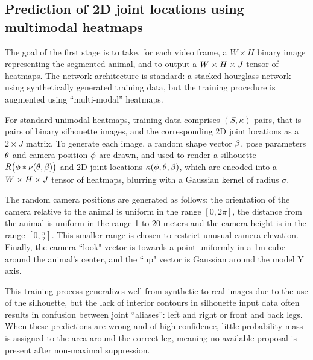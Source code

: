   \subsection{Prediction of 2D joint locations using multimodal heatmaps}
  The goal of the first stage is to take, for each video frame, a $W\times H$ binary image representing the segmented animal, and to output a $W \times H \times J$ tensor of heatmaps. The network architecture is standard: a stacked hourglass network~\cite{newell2016stacked} using synthetically generated training data, but the training procedure is augmented using ``multi-modal'' heatmaps. 
  
  For standard unimodal heatmaps, training data comprises $(S, \kappa)$ pairs, that is pairs of binary silhouette images, and the corresponding 2D joint locations as a $2\times J$ matrix.  To generate each image, a random shape vector $\beta$, pose parameters $\theta$ and camera position $\phi$ are drawn, and used to render a silhouette $R\bigl(\phi * \nu(\theta, \beta)\bigr)$ and 2D joint locations $\kappa(\phi,\theta,\beta)$, which are encoded into a $W \times H \times J$ tensor of heatmaps, blurring with a Gaussian kernel of radius $\sigma$. 
  
  The random camera positions are generated as follows: the orientation of the camera relative to the animal is uniform in the range $[0, 2\pi]$, the distance from the animal is uniform in the range 1 to 20 meters and the camera height is in the range $[0,\frac{\pi}{2}]$. This smaller range is chosen to restrict unusual camera elevation. Finally, the camera ``look" vector is towards a point uniformly in a 1m cube around the animal's center, and the ``up" vector is Gaussian around the model Y axis.  
  
  This training process generalizes well from synthetic to real images due to the use of the silhouette, but the lack of interior contours in silhouette input data often results in confusion between joint ``aliases'': left and right or front and back legs.  When these predictions are wrong and of high confidence, little probability mass is assigned to the area around the correct leg, meaning no available proposal is present after non-maximal suppression.
  

